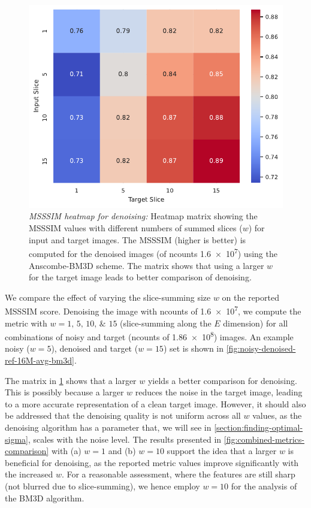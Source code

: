 
\begin{figure}
    \centering
    \includegraphics[width=0.5\linewidth]{images/confusion_matrix_msssim_window_avg.pdf}
    \caption{\textit{MSSSIM heatmap for denoising:} Heatmap matrix showing the \gls{MSSSIM} values with different numbers of summed slices ($w$) for input and target images. The \gls{MSSSIM} (higher is better) is computed for the denoised images (of \gls{ncounts} \num{1.6e7}) using the Anscombe-BM3D scheme. The matrix shows that using a larger $w$ for the target image leads to better comparison of denoising.}
    \label{fig:confusion_matrix_msssim_window_avg}
\end{figure}

We compare the effect of varying the slice-summing size $w$ on the reported \gls{MSSSIM} score. Denoising the image with \gls{ncounts} of \num{1.6e7}, we compute the metric with $w = \numlist{1;5;10;15}$ (slice-summing along the $E$ dimension) for all combinations of noisy and target (\gls{ncounts} of \num{1.86e8}) images. An example noisy ($w = 5$), denoised and target ($w=15$) set is shown in \cref{fig:noisy-denoised-ref-16M-avg-bm3d}. 

The matrix in \cref{fig:confusion_matrix_msssim_window_avg} shows that a larger $w$ yields a better comparison for denoising.  This is possibly because a larger $w$ reduces the noise in the target image, leading to a more accurate representation of a clean target image. However, it should also be addressed that the denoising quality is not uniform across all $w$ values, as the denoising algorithm has a parameter that, we will see in \cref{section:finding-optimal-sigma}, scales with the noise level. The results presented in \cref{fig:combined-metrics-comparison} with (a) $w=1$ and (b) $w=10$ support the idea that a larger $w$ is beneficial for denoising, as the reported metric values improve significantly with the increased $w$. For a reasonable assessment, where the features are still sharp (not blurred due to slice-summing), we hence employ $w=10$ for the analysis of the \gls{BM3D} algorithm.

